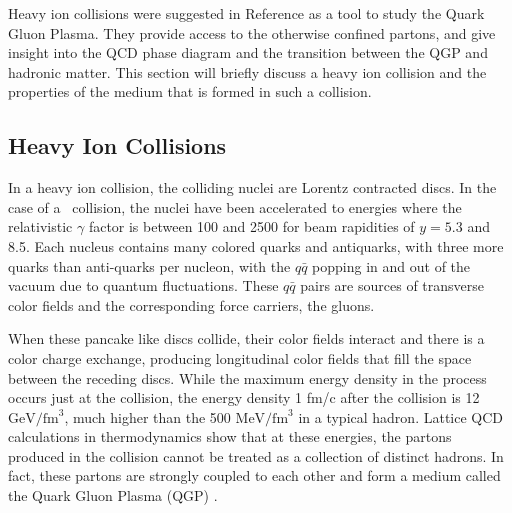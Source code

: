 
Heavy ion collisions were suggested in Reference \cite{SHURYAK198071} as a tool to study the Quark Gluon Plasma. They provide access to the otherwise confined partons, and give insight into the QCD phase diagram and the transition between the QGP and hadronic matter. This section will briefly discuss a heavy ion collision and the properties of the medium that is formed in such a collision.  

\subsection{Heavy Ion Collisions}
In a heavy ion collision, the colliding nuclei are Lorentz contracted discs. In the case of a \pbpb\ collision, the nuclei have been accelerated to energies where the relativistic $\gamma$ factor is between 100 and 2500 for beam rapidities of $y = 5.3$ and 8.5. Each nucleus contains many colored quarks and antiquarks, with three more quarks than anti-quarks per nucleon, with the $q\bar{q}$ popping in and out of the vacuum due to quantum fluctuations. These $q\bar{q}$ pairs are sources of transverse color fields and the corresponding force carriers, the gluons.

When these pancake like discs collide, their color fields interact and there is a color charge exchange, producing longitudinal color fields that fill the space between the receding discs. While the maximum energy density in the process occurs just at the collision, the energy density 1 fm/c after the collision is 12 $\mathrm{GeV} / \mathrm{fm}^3$, much higher than the 500 $\mathrm{MeV} / \mathrm{fm}^3$ in a typical hadron. Lattice QCD calculations in thermodynamics show that at these energies, the partons produced in the collision cannot be treated as a collection of distinct hadrons. In fact, these partons are strongly coupled to each other and form a medium called the Quark Gluon Plasma (QGP) \cite{???}. 


